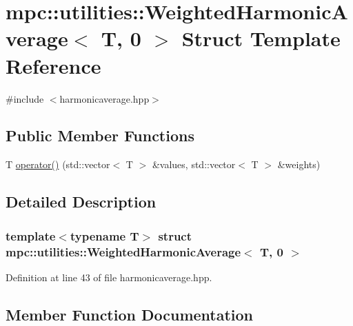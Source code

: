 \hypertarget{structmpc_1_1utilities_1_1_weighted_harmonic_average_3_01_t_00_010_01_4}{}\section{mpc\+:\+:utilities\+:\+:Weighted\+Harmonic\+Average$<$ T, 0 $>$ Struct Template Reference}
\label{structmpc_1_1utilities_1_1_weighted_harmonic_average_3_01_t_00_010_01_4}


{\ttfamily \#include $<$harmonicaverage.\+hpp$>$}

\subsection*{Public Member Functions}
\begin{DoxyCompactItemize}
\item 
T \mbox{\hyperlink{structmpc_1_1utilities_1_1_weighted_harmonic_average_3_01_t_00_010_01_4_a71276b6d5962cf7ae4db1d5088d8cc4e}{operator()}} (std\+::vector$<$ T $>$ \&values, std\+::vector$<$ T $>$ \&weights)
\end{DoxyCompactItemize}


\subsection{Detailed Description}
\subsubsection*{template$<$typename T$>$\newline
struct mpc\+::utilities\+::\+Weighted\+Harmonic\+Average$<$ T, 0 $>$}



Definition at line 43 of file harmonicaverage.\+hpp.



\subsection{Member Function Documentation}
\mbox{\label{structmpc_1_1utilities_1_1_weighted_harmonic_average_3_01_t_00_010_01_4_a71276b6d5962cf7ae4db1d5088d8cc4e}} 
